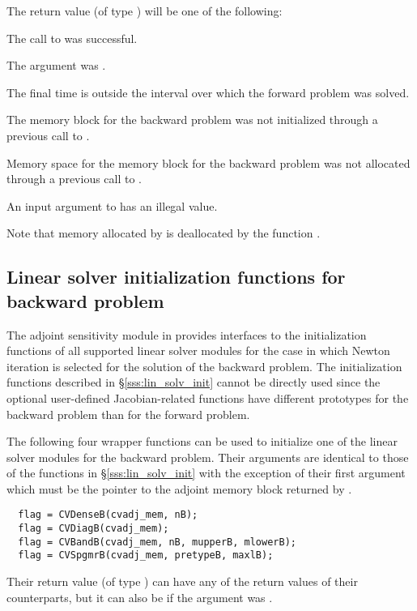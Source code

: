 {
  The return value  (of type ) will be one of the following:
  \begin{args}
  \item[\Id{CV\_SUCCESS}]
    The call to  was successful.
  \item[\Id{CV\_ADJMEM\_NULL}]
    The  argument was .
  \item[\Id{CV\_BAD\_TB0}]
    The final time  is outside the interval over which the forward problem
    was solved.
  \item[\Id{CV\_MEM\_NULL}] 
    The {\cvodes} memory block for the backward problem was not initialized through a 
    previous call to .
  \item[\Id{CV\_NO\_MALLOC}] 
    Memory space for the {\cvodes} memory block for the backward problem was not 
    allocated through a previous call to .
  \item[\Id{CV\_ILL\_INPUT}] 
    An input argument to  has an illegal value.
  \end{args}
}
{}
Note that memory allocated by  is deallocated by the function 
.

\subsection{Linear solver initialization functions for backward problem}
\label{sss:lin_solv_b}

The adjoint sensitivity module in {\cvodes} provides interfaces to the initialization
functions of all supported linear solver modules for the case in which Newton
iteration is selected for the solution of the backward problem. The initialization
functions described in \S\ref{sss:lin_solv_init} cannot be directly used since the
optional user-defined Jacobian-related functions have different prototypes for the
backward problem than for the forward problem.

The following four wrapper functions can be used to initialize one of the linear
solver modules for the backward problem. Their arguments are identical to those
of the functions in \S\ref{sss:lin_solv_init} with the exception of their first
argument which must be the pointer to the adjoint memory block returned by
.
\begin{verbatim}
  flag = CVDenseB(cvadj_mem, nB);
  flag = CVDiagB(cvadj_mem);
  flag = CVBandB(cvadj_mem, nB, mupperB, mlowerB);
  flag = CVSpgmrB(cvadj_mem, pretypeB, maxlB);
\end{verbatim}
Their return value  (of type ) can have any of the return values 
of their counterparts, but it can also be  if the  
argument was . 

